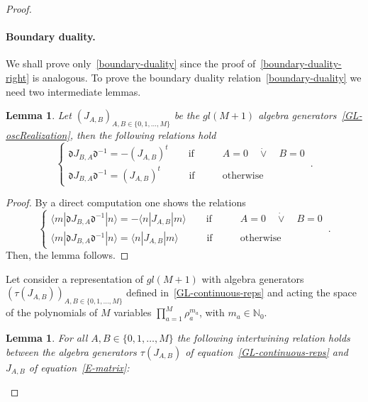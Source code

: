 \documentclass[11pt]{article}
\numberwithin{equation}{section}
\newtheorem{lemma}[theorem]{Lemma}
\newcommand{\M}{M}
\newcommand{\eJ}{J}
\newcommand{\rep}{\tau}
\begin{document}
\begin{proof}
	\paragraph{Boundary duality.} We shall prove only~\eqref{boundary-duality} since the proof of~\eqref{boundary-duality-right} is analogous. 
	To prove the boundary duality relation~\eqref{boundary-duality} we need two intermediate lemmas. 
   \begin{lemma}\label{Lemma-transposition-relation}
                Let $(\eJ_{A,B})_{A,B\in \{0,1,\ldots,\M\}}$ be the $gl(\M+1)$ algebra generators~\eqref{GL-oscRealization}, then the following relations hold
\begin{equation}\label{transposition-relation}
		\begin{cases}
			\mathfrak{d}\eJ_{B,A}\mathfrak{d}^{-1}=-\left(\eJ_{A,B}\right)^{t}\qquad \text{if}&\qquad A=0 \quad\dot \vee \quad B=0\\
			\mathfrak{d}\eJ_{B,A}\mathfrak{d}^{-1}=\left(\eJ_{A,B}\right)^{t}\qquad\;\;\; \text{if}&\qquad \text{otherwise}
		\end{cases}\,.
	\end{equation}
            \end{lemma}
            \begin{proof}
                By a direct computation one shows the relations
\begin{equation}\label{transposition-relation2}
		\begin{cases}
			\langle m|\mathfrak{d}\eJ_{B,A}\mathfrak{d}^{-1}|n\rangle =-\langle n|\eJ_{A,B}|m\rangle \qquad \text{if}&\qquad A=0 \quad\dot \vee \quad B=0\\
			\langle m|\mathfrak{d}\eJ_{B,A}\mathfrak{d}^{-1}|n\rangle =\langle n|\eJ_{A,B}|m\rangle\qquad\;\;\; \text{if}&\qquad \text{otherwise}
		\end{cases}\,.
	\end{equation}
    Then, the lemma follows. 
            \end{proof}    
    Let consider a representation of $gl(\M+1)$ with algebra generators $(\rep(J_{A,B}))_{A,B\in \{0,1,\ldots, \M\}}$ defined in~\eqref{GL-continuous-reps} and acting the space of the polynomials of $\M$ variables $\prod_{a=1}^{\M}\rho_{a}^{m_{a}}$, with $m_{a}\in \mathbb{N}_{0}$.
	\begin{lemma}\label{Lemma-intertwining}
		For all $A,B\in \{0,1,\ldots,\M\}$ the following intertwining relation holds between the algebra generators $\rep(J_{A,B})$  of equation~\eqref{GL-continuous-reps} and $\eJ_{A,B}$ of equation~\eqref{E-matrix}:

\end{lemma}
\end{proof}
\end{document}
